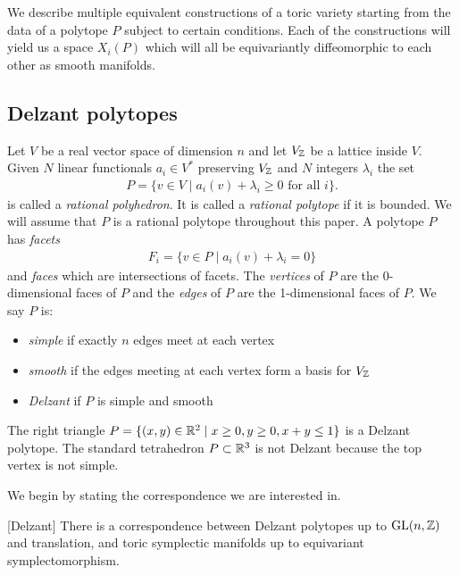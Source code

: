 We describe multiple equivalent constructions of a toric variety starting from the data
of a polytope $P$ subject to certain conditions. Each of 
the constructions will yield us a space $X_i(P)$ which will all be 
equivariantly diffeomorphic to each other as smooth manifolds. 



\subsection{Delzant polytopes}
Let $V$ be a real vector space of dimension $n$ and let $V_{\mathbb{Z}}$
be a lattice inside $V$. Given 
$N$ linear functionals $a_i \in V^*$ preserving $V_{\mathbb{Z}}$ and $N$ integers $\lambda_i$
the set \begin{align*}
P = \{ v \in V \mid a_i(v) + \lambda_i \geq 0 \text{ for all } i \}.
\end{align*} is called a \emph{rational polyhedron}. It is called 
a \emph{rational polytope} if it is bounded. We will assume that $P$ is a
rational polytope throughout this paper. A polytope $P$ has \emph{facets} \begin{align*}
F_i = \{ v \in P \mid a_i(v) + \lambda_i = 0 \}
\end{align*} and \emph{faces} which are intersections of facets. 
The \emph{vertices} of $P$ are the 0-dimensional faces of $P$ and 
the \emph{edges} of $P$ are the 1-dimensional faces of $P$.
We say $P$ is: \begin{itemize}
    \item \emph{simple} if exactly $n$ edges meet at each vertex
    \item \emph{smooth} if the edges meeting at each vertex form a basis for $V_{\mathbb{Z}}$
    \item \emph{Delzant} if $P$ is simple and smooth
\end{itemize}

\begin{example}
    The right triangle $P = \{ (x,y) \in \mathbb{R}^2 \mid x \geq 0, y \geq 0, x + y \leq 1 \}$ is a 
    Delzant polytope. The standard tetrahedron $P\subset\mathbb{R}^3$ is not Delzant because the
    top vertex is not simple.
\end{example}
We begin by stating the correspondence we are interested in.
\begin{theorem}\label{thm:delzant}
    [Delzant] There is a correspondence between Delzant polytopes up to $\operatorname{GL}(n,\mathbb{Z})$ 
    and translation, and toric symplectic manifolds up to equivariant symplectomorphism.
\end{theorem}

